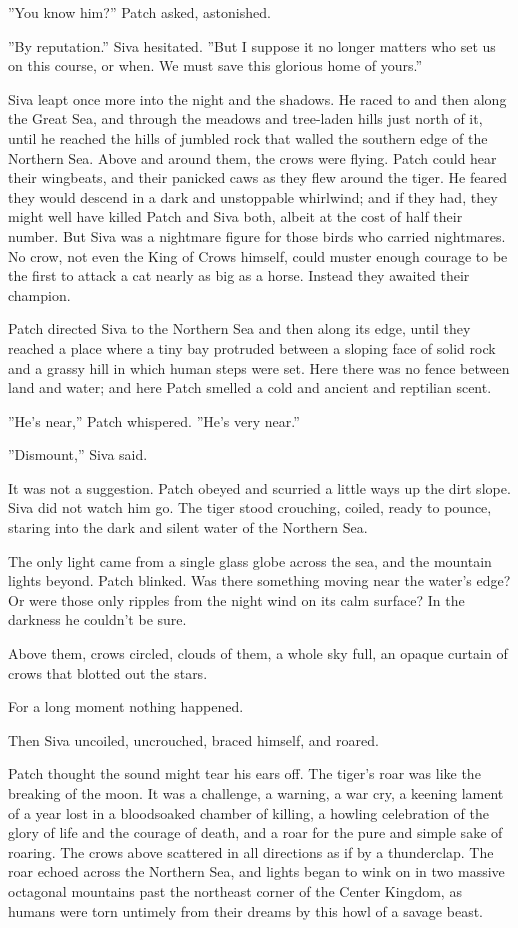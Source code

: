 \documentclass[12pt]{book}
\begin{document}
''You know him?'' Patch asked, astonished.

''By reputation.'' Siva hesitated. ''But I suppose it no longer matters who set us on this course, or when. We must save this glorious home of yours.''

Siva leapt once more into the night and the shadows. He raced to and then along the Great Sea, and through the meadows and tree-laden hills just north of it, until he reached the hills of jumbled rock that walled the southern edge of the Northern Sea. Above and around them, the crows were flying. Patch could hear their wingbeats, and their panicked caws as they flew around the tiger. He feared they would descend in a dark and unstoppable whirlwind; and if they had, they might well have killed Patch and Siva both, albeit at the cost of half their number. But Siva was a nightmare figure for those birds who carried nightmares. No crow, not even the King of Crows himself, could muster enough courage to be the first to attack a cat nearly as big as a horse. Instead they awaited their champion.

Patch directed Siva to the Northern Sea and then along its edge, until they reached a place where a tiny bay protruded between a sloping face of solid rock and a grassy hill in which human steps were set. Here there was no fence between land and water; and here Patch smelled a cold and ancient and reptilian scent.

''He's near,'' Patch whispered. ''He's very near.''

''Dismount,'' Siva said.

It was not a suggestion. Patch obeyed and scurried a little ways up the dirt slope. Siva did not watch him go. The tiger stood crouching, coiled, ready to pounce, staring into the dark and silent water of the Northern Sea.

The only light came from a single glass globe across the sea, and the mountain lights beyond. Patch blinked. Was there something moving near the water's edge? Or were those only ripples from the night wind on its calm surface? In the darkness he couldn't be sure.

Above them, crows circled, clouds of them, a whole sky full, an opaque curtain of crows that blotted out the stars.

For a long moment nothing happened.

Then Siva uncoiled, uncrouched, braced himself, and roared.

Patch thought the sound might tear his ears off. The tiger's roar was like the breaking of the moon. It was a challenge, a warning, a war cry, a keening lament of a year lost in a bloodsoaked chamber of killing, a howling celebration of the glory of life and the courage of death, and a roar for the pure and simple sake of roaring. The crows above scattered in all directions as if by a thunderclap. The roar echoed across the Northern Sea, and lights began to wink on in two massive octagonal mountains past the northeast corner of the Center Kingdom, as humans were torn untimely from their dreams by this howl of a savage beast.
\end{document}
